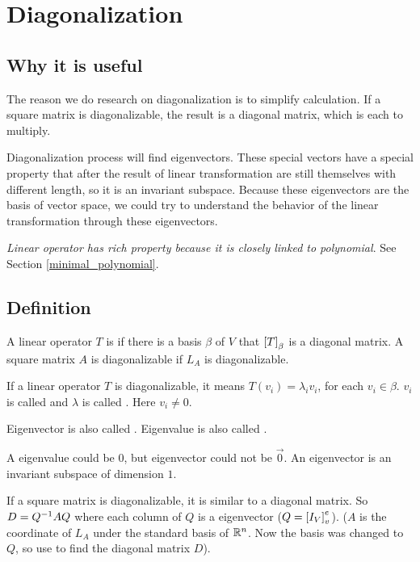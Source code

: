 \chapter{Diagonalization}

\section{Why it is useful}


The reason we do research on diagonalization is to simplify calculation. If a square matrix is diagonalizable, the result is a diagonal matrix, which is each to multiply.

Diagonalization process will find eigenvectors. These special vectors have a special property that after the result of linear transformation are still themselves with different length, so it is an invariant subspace. Because these eigenvectors are the basis of vector space, we could try to understand the behavior of the linear transformation through these eigenvectors.

\emph{Linear operator has rich property because it is closely linked to polynomial}. See Section \ref{minimal_polynomial}.

\section{Definition}


A linear operator $T$ is  if there is a basis $\beta$ of $V$ that $\coordinate{T}_\beta$ is a diagonal matrix. A square matrix $A$ is diagonalizable if $L_A$ is diagonalizable.

If a linear operator $T$ is diagonalizable, it means $T(v_i) = \lambda_i v_i$, for each $v_i \in \beta$. $v_i$ is called  and $\lambda$ is called . Here $v_i \neq 0$.

Eigenvector is also called . Eigenvalue is also called .

A eigenvalue could be $0$, but eigenvector could not be $\vec{0}$. An eigenvector is an invariant subspace of dimension $1$.


If a square matrix is diagonalizable, it is similar to a diagonal matrix. So $D = {Q}^{-1} A Q$ where each column of $Q$ is a eigenvector ($Q = \coordinate{I_V}_v^e$). ($A$ is the coordinate of $L_A$ under the standard basis of $\mathbb{R}^n$. Now the basis was changed to $Q$, so use  to find the diagonal matrix $D$).



